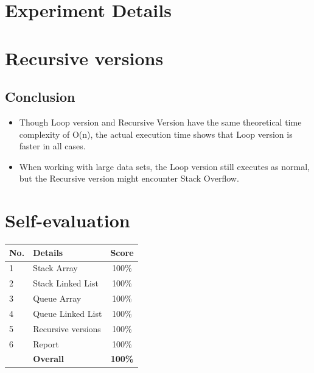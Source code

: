 \documentclass[a4paper, 12pt]{article}
\begin{document}
\tableofcontents\thispagestyle{empty}

\pagebreak
\section{Experiment Details}



\pagebreak
\section{Recursive versions}



\subsection{Conclusion}
\begin{itemize}
    \item Though Loop version and Recursive Version have the same theoretical time complexity of O(n), the actual execution time shows that Loop version is faster in all cases.
    \item When working with large data sets, the Loop version still executes as normal, but the Recursive version might encounter Stack Overflow.
\end{itemize}

\pagebreak
\section{Self-evaluation}
\begin{center}
  \renewcommand{\arraystretch}{1.5}
  \begin{tabular}{|l|p{}|c|}
    \hline
    \textbf{No.} & \textbf{Details}            & \textbf{Score} \\ \hline
    1            & Stack Array                 & 100\%          \\ \hline
    2            & Stack Linked List           & 100\%          \\ \hline
    3            & Queue Array                 & 100\%          \\ \hline
    4            & Queue Linked List           & 100\%          \\ \hline
    5            & Recursive versions          & 100\%          \\ \hline
    6            & Report                      & 100\%          \\ \hline
                 & \textbf{Overall}            & \textbf{100\%} \\ \hline
  \end{tabular}
\end{center}
\end{document}
